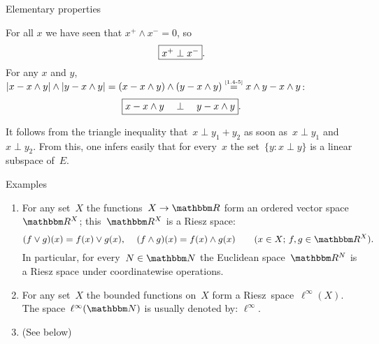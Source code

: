 \documentclass[main.tex]{subfiles}
\begin{document}
\begin{psec}{1.4}{Elementary properties}
\begin{enumerate}
For all $x$ we have seen that $x^+\wedge x^- = 0$,
so
\begin{equation*}
\fbox{$ x^+ \perp x^- $}
\text{.}
\end{equation*}
For any $x$ and $y$, 
$|x-x\wedge y|\wedge|y-x\wedge y|
=(x-x\wedge y) \wedge (y-x\wedge y)
\isref{1.4-5} x\wedge y - x\wedge y$:
\begin{equation*}
\fbox{$ x-x\wedge y \quad \perp \quad y- x\wedge y $}
\text{.}
\end{equation*}

It follows from the triangle inequality
 that~$x\perp y_1 + y_2$
as soon as~$x\perp y_1$ and $x\perp y_2$.
From this,
one infers easily that for every~$x$
the set~$\{ y: x\perp y\}$
is a linear subspace of~$E$.
%
\end{enumerate}
\end{psec}
%
%
%
%
\begin{psec}{1.5}{Examples}
\begin{enumerate}
\item
\label{1.5-1}
For any set~$X$
the functions~$X\ra \R$
form an ordered vector space~$\R^X$;
this~$\R^X$ is a Riesz space:
\begin{equation*}
(f\vee g)(x) = f(x)\vee g(x)\htam{, } \quad 
(f\wedge g)(x) = f(x)\wedge g(x)\qquad
(x\in X\htam{; }f,g\in\R^X)
\htam{.}
\end{equation*}
In particular,
for every~$N\in\N$
the Euclidean space~$\R^N$
is a Riesz space under coordinatewise operations.
%
\item
\label{1.5-2}
For any set~$X$ the bounded functions on~$X$ form a 
Riesz~space~$\ell^\infty(X)$.
The space~$\ell^\infty(\N)$ is usually denoted by: $\ell^\infty$.
%
\setcounter{list-1.5}{\value{enumi}}
\item
(See below)
\end{enumerate}
\end{psec}
%
%
\end{document}
